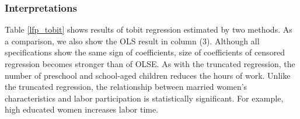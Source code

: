 \documentclass[
  12pt,
]{article}
\begin{document}
\hypertarget{interpretations-1}{%
\subsubsection{Interpretations}\label{interpretations-1}}

Table \ref{lfp_tobit} shows results of tobit regression estimated by two methods.
As a comparison, we also show the OLS result in column (3).
Although all specifications show the same sign of coefficients,
size of coefficients of censored regression becomes stronger than of OLSE.
As with the truncated regression,
the number of preschool and school-aged children reduces the hours of work.
Unlike the truncated regression,
the relationship between married women's characteristics and labor participation is statistically significant.
For example, high educated women increases labor time.
\end{document}
